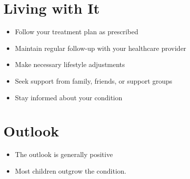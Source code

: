 \section{Living with It}
\begin{itemize}[noitemsep]
  \item Follow your treatment plan as prescribed
  \item Maintain regular follow-up with your healthcare provider
  \item Make necessary lifestyle adjustments
  \item Seek support from family, friends, or support groups
  \item Stay informed about your condition
\end{itemize}
\section{Outlook}
\begin{itemize}[noitemsep]
  \item The outlook is generally positive
  \item Most children outgrow the condition.
\end{itemize}
